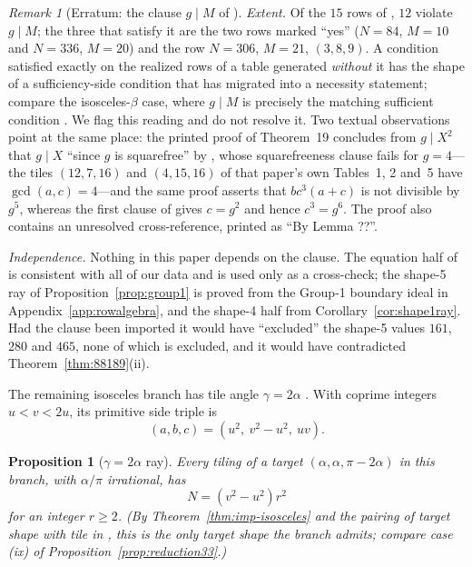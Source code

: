 \documentclass[11pt]{amsart}
\newtheorem{proposition}[theorem]{Proposition}
\theoremstyle{definition}
\theoremstyle{remark}
\newtheorem{remark}[theorem]{Remark}
\begin{document}
\begin{remark}[Erratum: the clause $g\mid M$ of {\cite[Thm.~19]{Beeson2229}}]
\emph{Extent.}  Of the $15$ rows of \cite[Table~5]{Beeson2229}, $12$ violate
$g\mid M$; the three that satisfy it are the two rows marked ``yes''
($N=84$, $M=10$ and $N=336$, $M=20$) and the row $N=306$, $M=21$,
$(3,8,9)$.  A condition satisfied exactly on the realized rows of a table
generated \emph{without} it has the shape of a sufficiency-side condition
that has migrated into a necessity statement; compare the isosceles-$\beta$
case, where $g\mid M$ is precisely the matching sufficient condition
\cite[Thm.~16]{Beeson2229}.  We flag this reading and do not resolve it.
Two textual observations point at the same place: the printed proof of
Theorem~19 concludes from $g\mid X^2$ that $g\mid X$ ``since $g$ is
squarefree'' by \cite[Lemma~8]{Beeson2229}, whose squarefreeness clause
fails for $g=4$---the tiles $(12,7,16)$ and $(4,15,16)$ of that paper's own
Tables~1, 2 and~5 have $\gcd(a,c)=4$---and the same proof asserts that
$bc^3(a+c)$ is not divisible by $g^5$, whereas the first clause of
\cite[Lemma~8]{Beeson2229} gives $c=g^2$ and hence $c^3=g^6$.  The proof
also contains an unresolved cross-reference, printed as ``By Lemma ??''.

\emph{Independence.}  Nothing in this paper depends on the clause.  The
equation half of \cite[Thm.~19]{Beeson2229} is consistent with all of our
data and is used only as a cross-check; the shape-5 ray of
Proposition~\ref{prop:group1} is proved from the Group-1 boundary ideal in
Appendix~\ref{app:rowalgebra}, and the shape-4 half from
Corollary~\ref{cor:shape1ray}.  Had the clause been imported it would have
``excluded'' the shape-5 values $161$, $280$ and $465$, none of which is
excluded, and it would have contradicted Theorem~\ref{thm:88189}(ii).
\end{remark}

The remaining isosceles branch has tile angle $\gamma=2\alpha$
\cite{BeesonIso}.  With coprime
integers $u<v<2u$, its primitive side triple is
\[
            (a,b,c)=(u^2,\ v^2-u^2,\ uv).
\]

\begin{proposition}[$\gamma=2\alpha$ ray]\label{prop:gamma2alpha}
Every tiling of a target $(\alpha,\alpha,\pi-2\alpha)$ in this branch, with
$\alpha/\pi$ irrational, has
\[
                 N=(v^2-u^2)r^2
\]
for an integer $r\ge2$.  \textup{(}By Theorem~\ref{thm:imp-isosceles} and
the pairing of target shape with tile in \cite[Table~4]{Beeson7}, this is
the only target shape the branch admits; compare case \textup{(ix)} of
Proposition~\ref{prop:reduction33}.\textup{)}
\end{proposition}
\end{document}
